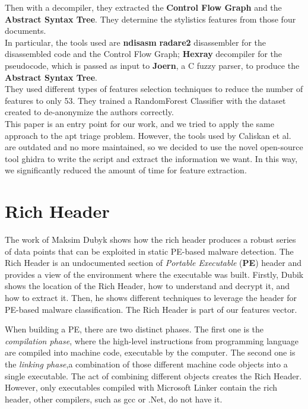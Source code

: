 Then with a decompiler, they extracted the \textbf{Control Flow Graph} and the \textbf{Abstract Syntax Tree}. They determine the stylistics features from those four documents.
\\
In particular, the tools used are \textbf{ndisasm} \textbf{radare2} disassembler for the disassembled code and the Control Flow Graph; \textbf{Hexray} decompiler for the pseudocode, which is passed as input to \textbf{Joern}, a C fuzzy parser, to produce the  \textbf{Abstract Syntax Tree}.\\

They used different types of features selection techniques to reduce the number of features to only 53. They trained a RandomForest Classifier with the dataset created to de-anonymize the authors correctly. \\

This paper is an entry point for our work, and we tried to apply the same approach to the apt triage problem. However, the tools used by Caliskan et al. are outdated and no more maintained, so we decided to use the novel open-source tool ghidra to write the script and extract the information we want. In this way, we significantly reduced the amount of time for feature extraction.



\section{Rich Header}

The work of Maksim Dubyk \cite{dubyk2019sans} shows how the rich header produces a robust series of data points that can be exploited in static PE-based malware detection. The Rich Header is an undocumented section of \textit{Portable Executable} (\textbf{PE}) header and provides a view of the environment where the executable was built. Firstly, Dubik shows the location of the Rich Header, how to understand and decrypt it, and how to extract it. Then, he shows different techniques to leverage the header for PE-based malware classification. The Rich Header is part of our features vector.

When building a PE, there are two distinct phases. The first one is the \textit{compilation phase}, where the high-level instructions from programming language are compiled into machine code, executable by the computer. The second one is the \textit{linking phase},a combination of those different machine code objects into a single executable. The act of combining different objects creates the Rich Header. However, only executables compiled with Microsoft Linker contain the rich header, other compilers, such as gcc or .Net,  do not have it.

